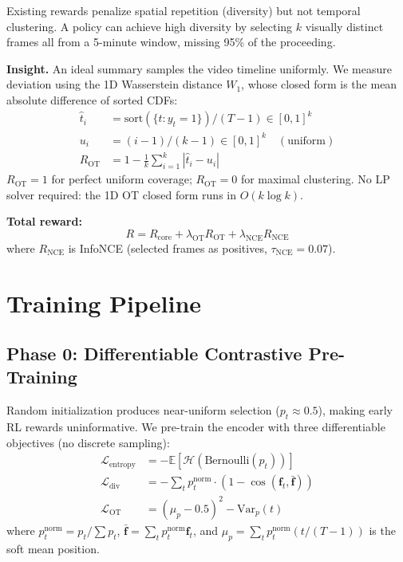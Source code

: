 \documentclass[letterpaper]{article}
\begin{document}
Existing rewards penalize spatial repetition (diversity) but not temporal
clustering. A policy can achieve high diversity by selecting $k$ visually
distinct frames all from a 5-minute window, missing 95\% of the proceeding.

\textbf{Insight.} An ideal summary samples the video timeline uniformly. We
measure deviation using the 1D Wasserstein distance $W_1$, whose closed form
is the mean absolute difference of sorted CDFs:
\begin{align}
\hat{t}_i &= \text{sort}(\{t : y_t=1\})/(T-1) \in [0,1]^k \\
u_i &= (i-1)/(k-1) \in [0,1]^k \quad (\text{uniform}) \\
R_{\text{OT}} &= 1 - \frac{1}{k}\sum_{i=1}^k |\hat{t}_i - u_i|
\end{align}
$R_{\text{OT}}=1$ for perfect uniform coverage; $R_{\text{OT}}=0$ for maximal
clustering. No LP solver required: the 1D OT closed form runs in $O(k\log k)$.

\textbf{Total reward:}
\begin{equation}
R = R_{\text{core}} + \lambda_{\text{OT}} R_{\text{OT}} + \lambda_{\text{NCE}} R_{\text{NCE}}
\end{equation}
where $R_{\text{NCE}}$ is InfoNCE (selected frames as positives, $\tau_{\text{NCE}}=0.07$).

\section{Training Pipeline}

\subsection{Phase 0: Differentiable Contrastive Pre-Training}

Random initialization produces near-uniform selection ($p_t \approx 0.5$),
making early RL rewards uninformative. We pre-train the encoder with three
differentiable objectives (no discrete sampling):
\begin{align}
\mathcal{L}_{\text{entropy}} &= -\mathbb{E}[\mathcal{H}(\text{Bernoulli}(p_t))] \\
\mathcal{L}_{\text{div}} &= -\sum_t p_t^{\text{norm}} \cdot (1 - \cos(\mathbf{f}_t, \bar{\mathbf{f}})) \\
\mathcal{L}_{\text{OT}} &= (\mu_p - 0.5)^2 - \text{Var}_p(t)
\end{align}
where $p_t^{\text{norm}} = p_t/\sum p_t$, $\bar{\mathbf{f}} = \sum_t p_t^{\text{norm}} \mathbf{f}_t$,
and $\mu_p = \sum_t p_t^{\text{norm}}(t/(T-1))$ is the soft mean position.
\end{document}
